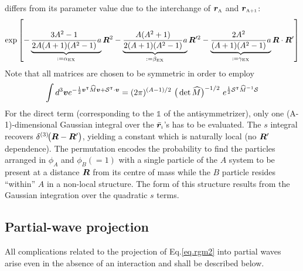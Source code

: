 \documentclass[aps,prd,onecolumn
,tightenlines,letterpaper,
notitlepage,11pt,
nofootinbib]{revtex4-1}
\begin{document}
differs from its parameter value due to the interchange of $\boldsymbol{r}_\text{\tiny A}$ and $\boldsymbol{r}_\text{\tiny A+1}$:
\begin{equation}
\exp{\left[-\underbrace{\frac{3A^2-1}{2A(A+1)(A^2-1)}a}_{:=\alpha_\text{\tiny EX}}\ensuremath{\boldsymbol{R}}^2-
\underbrace{\frac{A(A^2+1)}{2(A+1)(A^2-1)}a}_{:=\beta_\text{\tiny EX}}\ensuremath{\boldsymbol{R}}'^2-
\underbrace{\frac{2A^2}{(A+1)(A^2-1)}a}_{:=\gamma_\text{\tiny EX}}\ensuremath{\boldsymbol{R}}\cdot\ensuremath{\boldsymbol{R}}'\right]}
\end{equation}
Note that all matrices are chosen to be symmetric in order to employ
$$
\int d^3\boldsymbol{v}e^{-\frac{1}{2}\boldsymbol{v}^\intercal{\widehat{M}}\boldsymbol{v}+{\mathcal S}^\intercal\cdot\boldsymbol{v}}=(2\pi)^{(A-1)/2}~\big(\det{\widehat{M}}\big)^{-1/2}~e^{\frac{1}{2}{\mathcal S}^\intercal{\widehat{M}}^{-1}{\mathcal S}}
$$
For the direct term (corresponding to the $\mathbb{1}$ of the antisymmetrizer), only
one (A-1)-dimensional Gaussian integral over the $\bar{\boldsymbol{r}}_\text{\tiny i}$'s has to be evaluated.
The $s$ integral recovers $\delta^{(3)}\!\big(\boldsymbol{R}-\boldsymbol{R}'\big)$, yielding a constant which is
naturally local (no $\boldsymbol{R}'$ dependence). The permutation encodes the probability to
find the particles arranged in $\phi_A$ and $\phi_B(=1)$ with a single particle of
the $A$ system to be present at a distance $\boldsymbol{R}$ from its centre of mass while the
$B$ particle resides ``within'' $A$ in a non-local structure. The form of this
structure results from the Gaussian integration over the quadratic $s$ terms.

\subsection{Partial-wave projection}
All complications related to the projection of Eq.\eqref{eq.rgm2} into partial waves
arise even in the absence of an interaction and shall be described below.
\end{document}
